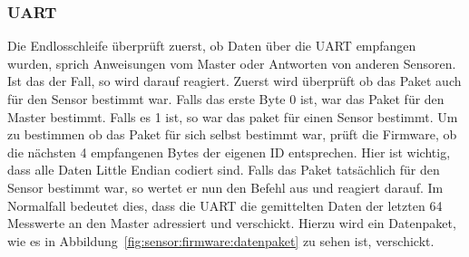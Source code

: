 {\begin{a3pages}
{\begin{minipage}{135mm}
\subsubsection{UART}
\label{subs:UART}

Die Endlosschleife  \"uberpr\"uft zuerst, ob  Daten \"uber die  UART empfangen
wurden, sprich Anweisungen vom Master oder Antworten von anderen Sensoren. Ist
das der Fall, so wird darauf reagiert.  Zuerst wird \"uberpr\"uft ob das Paket
auch f\"ur den Sensor bestimmt war. Falls das  erste Byte 0 ist, war das Paket
f\"ur den Master bestimmt. Falls es 1 ist, so war das paket f\"ur einen Sensor
bestimmt. Um  zu  bestimmen ob  das  Paket  f\"ur  sich selbst  bestimmt  war,
pr\"uft  die Firmware,  ob  die  n\"achsten 4  empfangenen  Bytes der  eigenen
ID  entsprechen. Hier  ist wichtig,  dass  alle  Daten Little  Endian  codiert
sind.  Falls das Paket tats\"achlich f\"ur  den Sensor bestimmt war, so wertet
er  nun den  Befehl  aus  und reagiert  darauf. Im  Normalfall bedeutet  dies,
dass  die  UART  die  gemittelten  Daten  der  letzten  64  Messwerte  an  den
Master  adressiert  und verschickt. Hierzu  wird  ein  Datenpaket, wie  es  in
Abbildung~\ref{fig:sensor:firmware:datenpaket} zu sehen ist, verschickt.

\end{minipage}}
\hspace*{45mm}

\end{a3pages}}

